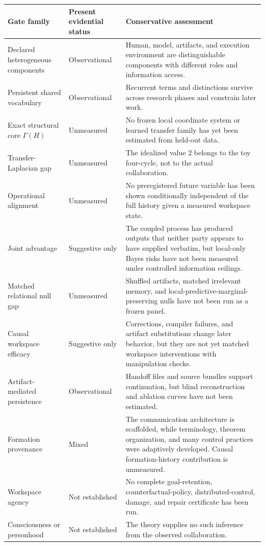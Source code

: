 \documentclass[11pt,letterpaper]{article}
\theoremstyle{plain}
\theoremstyle{definition}
\begin{document}
\begin{center}
\small
\begin{tabularx}{\textwidth}{@{}>{\raggedright\arraybackslash}p{}>{\raggedright\arraybackslash}p{}>{\raggedright\arraybackslash}X@{}}
\toprule
Gate family & Present evidential status & Conservative assessment \\
\midrule
Declared heterogeneous components & Observational & Human, model, artifacts,
and execution environment are distinguishable components with different
roles and information access. \\
Persistent shared vocabulary & Observational & Recurrent terms and distinctions
survive across research phases and constrain later work. \\
Exact structural core \(\Gamma(H)\) & Unmeasured & No frozen local coordinate
system or learned transfer family has yet been estimated from held-out data. \\
Transfer-Laplacian gap & Unmeasured & The idealized value \(2\) belongs to the
toy four-cycle, not to the actual collaboration. \\
Operational alignment & Unmeasured & No preregistered future variable has been
shown conditionally independent of the full history given a measured workspace
state. \\
Joint advantage & Suggestive only & The coupled process has produced outputs
that neither party appears to have supplied verbatim, but local-only Bayes risks
have not been measured under controlled information ceilings. \\
Matched relational null gap & Unmeasured & Shuffled artifacts, matched irrelevant
memory, and local-predictive-marginal-preserving nulls have not been run as a
frozen panel. \\
Causal workspace efficacy & Suggestive only & Corrections, compiler failures,
and artifact substitutions change later behavior, but they are not yet matched
workspace interventions with manipulation checks. \\
Artifact-mediated persistence & Observational & Handoff files and source bundles
support continuation, but blind reconstruction and ablation curves have not
been estimated. \\
Formation provenance & Mixed & The communication architecture is scaffolded,
while terminology, theorem organization, and many control practices were
adaptively developed. Causal formation-history contribution is unmeasured. \\
Workspace agency & Not established & No complete goal-retention,
counterfactual-policy, distributed-control, damage, and repair certificate has
been run. \\
Consciousness or personhood & Not established & The theory supplies no such
inference from the observed collaboration. \\
\bottomrule
\end{tabularx}
\end{center}
\end{document}

